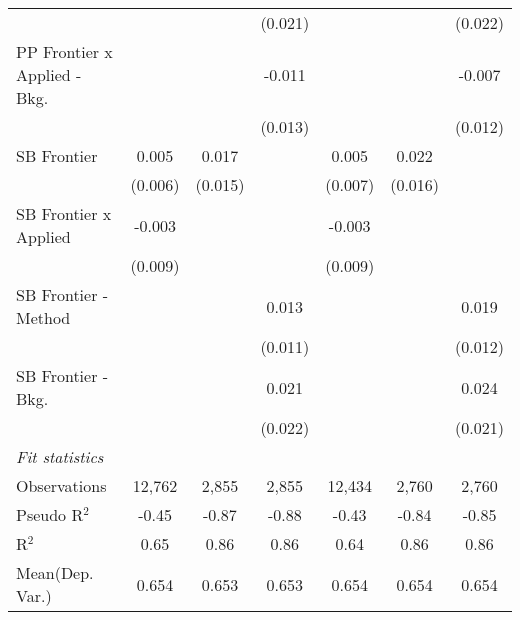 \begin{tabular}{lcccccc}
                                  &                &         & (0.021)        &                &         & (0.022)\\   
   PP Frontier x Applied - Bkg.   &                &         & -0.011         &                &         & -0.007\\   
                                  &                &         & (0.013)        &                &         & (0.012)\\   
   SB Frontier                    & 0.005          & 0.017   &                & 0.005          & 0.022   &   \\   
                                  & (0.006)        & (0.015) &                & (0.007)        & (0.016) &   \\   
   SB Frontier x Applied          & -0.003         &         &                & -0.003         &         &   \\   
                                  & (0.009)        &         &                & (0.009)        &         &   \\   
   SB Frontier - Method           &                &         & 0.013          &                &         & 0.019\\   
                                  &                &         & (0.011)        &                &         & (0.012)\\   
   SB Frontier - Bkg.             &                &         & 0.021          &                &         & 0.024\\   
                                  &                &         & (0.022)        &                &         & (0.021)\\   
   \midrule
   \emph{Fit statistics}\\
   Observations                   & 12,762         & 2,855   & 2,855          & 12,434         & 2,760   & 2,760\\  
   Pseudo R$^2$                   & -0.45          & -0.87   & -0.88          & -0.43          & -0.84   & -0.85\\  
   R$^2$                          & 0.65           & 0.86    & 0.86           & 0.64           & 0.86    & 0.86\\  
Mean(Dep. Var.) & 0.654 & 0.653 & 0.653 & 0.654 & 0.654 & 0.654 \\
   

\end{tabular}
